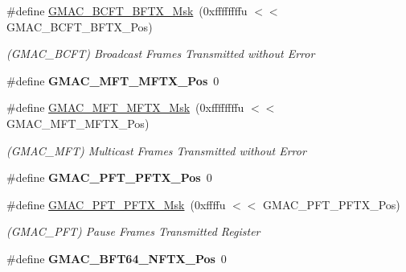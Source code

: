 \begin{DoxyCompactItemize}
\#define \mbox{\hyperlink{group__SAME70__GMAC_ga3ed88179ac9dd969cdebd55f76a5d230}{G\+M\+A\+C\+\_\+\+B\+C\+F\+T\+\_\+\+B\+F\+T\+X\+\_\+\+Msk}}~(0xffffffffu $<$$<$ G\+M\+A\+C\+\_\+\+B\+C\+F\+T\+\_\+\+B\+F\+T\+X\+\_\+\+Pos)
\begin{DoxyCompactList}\small\item\em (G\+M\+A\+C\+\_\+\+B\+C\+FT) Broadcast Frames Transmitted without Error \end{DoxyCompactList}\item 
\mbox{\label{group__SAME70__GMAC_ga5ae60d81b5df40bdeb3d4e99c6c3ea69}} 
\#define {\bfseries G\+M\+A\+C\+\_\+\+M\+F\+T\+\_\+\+M\+F\+T\+X\+\_\+\+Pos}~0
\item 
\mbox{\label{group__SAME70__GMAC_ga3567bb3ed49010afbb2252ca4b62cc35}} 
\#define \mbox{\hyperlink{group__SAME70__GMAC_ga3567bb3ed49010afbb2252ca4b62cc35}{G\+M\+A\+C\+\_\+\+M\+F\+T\+\_\+\+M\+F\+T\+X\+\_\+\+Msk}}~(0xffffffffu $<$$<$ G\+M\+A\+C\+\_\+\+M\+F\+T\+\_\+\+M\+F\+T\+X\+\_\+\+Pos)
\begin{DoxyCompactList}\small\item\em (G\+M\+A\+C\+\_\+\+M\+FT) Multicast Frames Transmitted without Error \end{DoxyCompactList}\item 
\mbox{\label{group__SAME70__GMAC_ga3ae9df7f8cdacbc6ed25fafbfcb35cda}} 
\#define {\bfseries G\+M\+A\+C\+\_\+\+P\+F\+T\+\_\+\+P\+F\+T\+X\+\_\+\+Pos}~0
\item 
\mbox{\label{group__SAME70__GMAC_gaf2778059f9c29b0a61517457d3129b44}} 
\#define \mbox{\hyperlink{group__SAME70__GMAC_gaf2778059f9c29b0a61517457d3129b44}{G\+M\+A\+C\+\_\+\+P\+F\+T\+\_\+\+P\+F\+T\+X\+\_\+\+Msk}}~(0xffffu $<$$<$ G\+M\+A\+C\+\_\+\+P\+F\+T\+\_\+\+P\+F\+T\+X\+\_\+\+Pos)
\begin{DoxyCompactList}\small\item\em (G\+M\+A\+C\+\_\+\+P\+FT) Pause Frames Transmitted Register \end{DoxyCompactList}\item 
\mbox{\label{group__SAME70__GMAC_ga8019fde7ed85de6c3ea75f27196d6dda}} 
\#define {\bfseries G\+M\+A\+C\+\_\+\+B\+F\+T64\+\_\+\+N\+F\+T\+X\+\_\+\+Pos}~0
\item 
\mbox{\label{group__SAME70__GMAC_ga6e1cd43a003747f6ee88811f0a1e569a}} 
$$
\end{DoxyCompactItemize}
